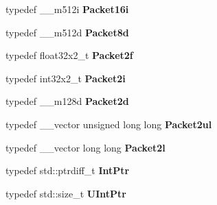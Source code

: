 \begin{DoxyCompactItemize}
typedef \+\_\+\+\_\+m512i {\bfseries Packet16i}
\item 
\mbox{\label{namespace_eigen_1_1internal_a39f8677eebe0898f820dbf3168fc5780}} 
typedef \+\_\+\+\_\+m512d {\bfseries Packet8d}
\item 
\mbox{\label{namespace_eigen_1_1internal_aa6fad2033c6a65eea2b7d918a62f4c83}} 
typedef float32x2\+\_\+t {\bfseries Packet2f}
\item 
\mbox{\label{namespace_eigen_1_1internal_ae5f510152f1fc1cfa8e3c26647708c62}} 
typedef int32x2\+\_\+t {\bfseries Packet2i}
\item 
\mbox{\label{namespace_eigen_1_1internal_a071504a8c370c69609dc68dbf8d4d9f7}} 
typedef \+\_\+\+\_\+m128d {\bfseries Packet2d}
\item 
\mbox{\label{namespace_eigen_1_1internal_af83dae7998b670a04db19e156e4258cb}} 
typedef \+\_\+\+\_\+vector unsigned long long {\bfseries Packet2ul}
\item 
\mbox{\label{namespace_eigen_1_1internal_a09f246eaec5d186fa8217682db8d3cdd}} 
typedef \+\_\+\+\_\+vector long long {\bfseries Packet2l}
\item 
\mbox{\label{namespace_eigen_1_1internal_aa163dba844d8d3fb778e6cc6b207d61e}} 
typedef std\+::ptrdiff\+\_\+t {\bfseries Int\+Ptr}
\item 
\mbox{\label{namespace_eigen_1_1internal_a017bb5f182d0e8afd1fed693649d2436}} 
typedef std\+::size\+\_\+t {\bfseries U\+Int\+Ptr}
\end{DoxyCompactItemize}

